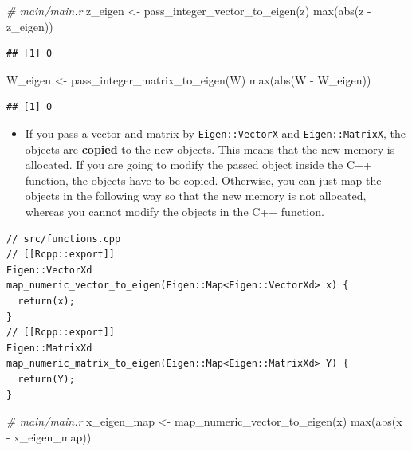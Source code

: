 \documentclass[
]{book}
\newenvironment{Shaded}{\begin{snugshade}}{\end{snugshade}}
\newcommand{\CommentTok}[1]{\textcolor[rgb]{0.56,0.35,0.01}{\textit{#1}}}
\newcommand{\FunctionTok}[1]{\textcolor[rgb]{0.00,0.00,0.00}{#1}}
\newcommand{\NormalTok}[1]{#1}
\newcommand{\OtherTok}[1]{\textcolor[rgb]{0.56,0.35,0.01}{#1}}
\newcommand{\SpecialCharTok}[1]{\textcolor[rgb]{0.00,0.00,0.00}{#1}}
\providecommand{\tightlist}{%
  \setlength{\itemsep}{0pt}\setlength{\parskip}{0pt}}
\begin{document}
\begin{Shaded}
\begin{Highlighting}[]
\CommentTok{\# main/main.r}
\NormalTok{z\_eigen }\OtherTok{\textless{}{-}} \FunctionTok{pass\_integer\_vector\_to\_eigen}\NormalTok{(z)}
\FunctionTok{max}\NormalTok{(}\FunctionTok{abs}\NormalTok{(z }\SpecialCharTok{{-}}\NormalTok{ z\_eigen))}
\end{Highlighting}
\end{Shaded}

\begin{verbatim}
## [1] 0
\end{verbatim}

\begin{Shaded}
\begin{Highlighting}[]
\NormalTok{W\_eigen }\OtherTok{\textless{}{-}} \FunctionTok{pass\_integer\_matrix\_to\_eigen}\NormalTok{(W)}
\FunctionTok{max}\NormalTok{(}\FunctionTok{abs}\NormalTok{(W }\SpecialCharTok{{-}}\NormalTok{ W\_eigen))}
\end{Highlighting}
\end{Shaded}

\begin{verbatim}
## [1] 0
\end{verbatim}

\begin{itemize}
\tightlist
\item
  If you pass a vector and matrix by \texttt{Eigen::VectorX} and \texttt{Eigen::MatrixX}, the objects are \textbf{copied} to the new objects. This means that the new memory is allocated. If you are going to modify the passed object inside the C++ function, the objects have to be copied. Otherwise, you can just map the objects in the following way so that the new memory is not allocated, whereas you cannot modify the objects in the C++ function.
\end{itemize}

\begin{verbatim}
// src/functions.cpp
// [[Rcpp::export]]
Eigen::VectorXd map_numeric_vector_to_eigen(Eigen::Map<Eigen::VectorXd> x) {
  return(x);
}
// [[Rcpp::export]]
Eigen::MatrixXd map_numeric_matrix_to_eigen(Eigen::Map<Eigen::MatrixXd> Y) {
  return(Y);
}
\end{verbatim}

\begin{Shaded}
\begin{Highlighting}[]
\CommentTok{\# main/main.r}
\NormalTok{x\_eigen\_map }\OtherTok{\textless{}{-}} \FunctionTok{map\_numeric\_vector\_to\_eigen}\NormalTok{(x)}
\FunctionTok{max}\NormalTok{(}\FunctionTok{abs}\NormalTok{(x }\SpecialCharTok{{-}}\NormalTok{ x\_eigen\_map))}
\end{Highlighting}
\end{Shaded}
\end{document}
